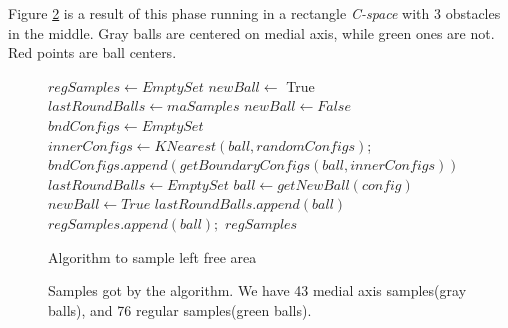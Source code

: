 \documentclass[11pt]{article}
\begin{document}
\indent Figure \ref{Samples} is a result of this phase running in a rectangle \emph{C-space} with 3 obstacles in the middle. Gray balls are centered on medial axis, while green ones are not. Red points are ball centers.

\begin{figure}
\begin{algorithmic}[1] 
  	\State $regSamples \gets EmptySet$ 
  	\State $newBall \gets$ True	
  	\State $lastRoundBalls \gets maSamples$
  		\State $newBall \gets False$
		\State $bndConfigs \gets EmptySet$   		
  			\State $innerConfigs \gets KNearest(ball, randomConfigs)$; 
  			\State $bndConfigs.append( getBoundaryConfigs(ball, innerConfigs) )$
  		\EndFor
  		\State $lastRoundBalls \gets EmptySet$
  			 
  				\State $ball \gets getNewBall(config)$ 
  					\State $newBall \gets True$
  					\State $lastRoundBalls.append( ball )$
  					\State $regSamples.append(ball);$
  				\EndIf
  			\EndIf
  		\EndFor
  	\EndWhile
  	\State \Return $regSamples$
  \EndFunction
  \end{algorithmic}
  \caption{\label{SampleLeftArea} Algorithm to sample left free area}
\end{figure}

\begin{figure}
	\caption{\label{Samples} Samples got by the algorithm. We have 43 medial axis samples(gray balls), and 76 regular samples(green balls). }
\end{figure}
\end{document}
